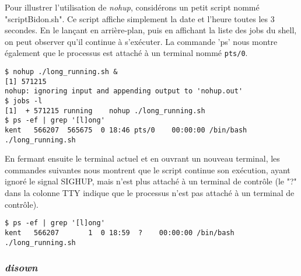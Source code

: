 Pour illustrer l'utilisation de \textit{nohup}, considérons un petit script nommé "scriptBidon.sh". Ce script affiche simplement la date et l'heure toutes les 3 secondes. En le lançant en arrière-plan, puis 
en affichant la liste des jobs du shell, on peut observer qu'il continue à s'exécuter. La commande 'ps' nous montre également que le processus est attaché à un terminal nommé \texttt{pts/0}.

\begin{lstlisting}
$ nohup ./long_running.sh &
[1] 571215
nohup: ignoring input and appending output to 'nohup.out'                              
$ jobs -l
[1]  + 571215 running    nohup ./long_running.sh
$ ps -ef | grep '[l]ong'
kent   566207  565675  0 18:46 pts/0    00:00:00 /bin/bash ./long_running.sh
\end{lstlisting}

En fermant ensuite le terminal actuel et en ouvrant un nouveau terminal, les commandes suivantes nous montrent que le script continue son exécution, ayant ignoré le signal SIGHUP, 
mais n'est plus attaché à un terminal de contrôle (le "?" dans la colonne TTY indique que le processus n'est pas attaché à un terminal de contrôle).

\begin{lstlisting}
$ ps -ef | grep '[l]ong'
kent   566207       1  0 18:59  ?    00:00:00 /bin/bash ./long_running.sh
\end{lstlisting}




\subsubsection{\textit{disown}}



